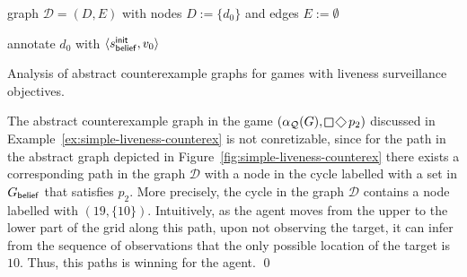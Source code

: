 \begin{algorithm}[t] \small
{}

\smallskip

graph $\mathcal D = (D,E)$ with nodes $D := \{d_0\}$ and edges $E := \emptyset$\;

annotate $d_0$ with $\langle s_{\mathsf{belief}}^{\mathsf{init}}, v_0\rangle$\; 


{\KwRet{$\pi$;}}
{}

\smallskip

\caption{Analysis of abstract counterexample graphs for games with liveness surveillance objectives.}
\label{algo:cex-analysis-liveness}
\end{algorithm}

\begin{example}\label{ex:simple-liveness-unconcretizable}
The abstract counterexample graph in the game $(\alpha_\part(G),\LTLglobally \LTLfinally p_2)$ discussed in Example~\ref{ex:simple-liveness-counterex} is not conretizable, since for the path in the abstract graph depicted in Figure~\ref{fig:simple-liveness-counterex} there exists a corresponding path in the graph $\mathcal D$ with a node in the cycle labelled with a set in $G_{\mathsf{belief}}$ that satisfies $p_2$. More precisely, the cycle in the graph $\mathcal D$ contains a node labelled with $(19,\{10\})$. Intuitively, as the agent moves from the upper to the lower part of the grid along this path, upon not observing the target, it can infer from the sequence of observations that the only possible location of the target is $10$. Thus, this paths is winning for the agent.
\qed
\end{example}

